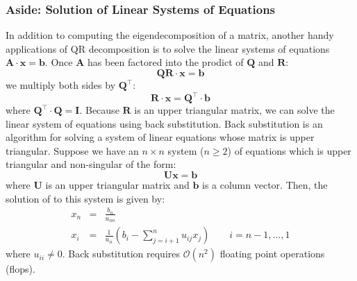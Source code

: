\documentclass{article}[11pt]
\begin{document}
\subsubsection*{Aside: Solution of Linear Systems of Equations}
In addition to computing the eigendecomposition of a matrix, another handy applications of QR decomposition is to solve the linear systems of equations $\mathbf{A}\cdot\mathbf{x} = \mathbf{b}$.
Once $\mathbf{A}$ has been factored into the prodict of $\mathbf{Q}$ and $\mathbf{R}$:
\begin{equation}
\mathbf{Q}\mathbf{R}\cdot\mathbf{x} = \mathbf{b}
\end{equation}
we multiply both sides by $\mathbf{Q}^{\top}$:
\begin{equation}
\mathbf{R}\cdot\mathbf{x} = \mathbf{Q}^{\top}\cdot\mathbf{b}
\end{equation}
where $\mathbf{Q}^{\top}\cdot\mathbf{Q} = \mathbf{I}$. Because $\mathbf{R}$ is an upper triangular matrix, 
we can solve the linear system of equations using back substitution. Back substitution is an algorithm for solving a system of linear equations whose matrix is upper triangular.
Suppose we have an $n\times{n}$ system ($n\geq{2}$) of equations which is upper triangular and non-singular of the form:
\begin{equation*}
\mathbf{U}\mathbf{x} = \mathbf{b}
\end{equation*}
where $\mathbf{U}$ is an upper triangular matrix and $\mathbf{b}$ is a column vector.
Then, the solution of to this system is given by:
\begin{eqnarray*}
x_{n} & = & \frac{b_{n}}{u_{nn}} \\
x_{i} & = & \frac{1}{u_{ii}}\left(b_{i} - \sum_{j=i+1}^{n}u_{ij}x_{j}\right)\qquad{i=n-1,\dots,1}
\end{eqnarray*}
where $u_{ii}\neq{0}$. Back substitution requires $\mathcal{O}(n^{2})$ floating point operations (flops).
\end{document}
